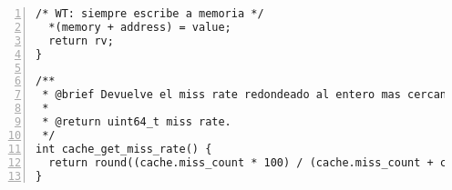 \documentclass[11pt,a4paper]{article}
\begin{document}
\begin{lstlisting}[numbers=left, tabsize=2, basicstyle=\fontsize{11}{13}\ttfamily, frame=single, caption={makefile}]
  /* WT: siempre escribe a memoria */
  *(memory + address) = value;
  return rv;
}

/**
 * @brief Devuelve el miss rate redondeado al entero mas cercano.
 *
 * @return uint64_t miss rate.
 */
int cache_get_miss_rate() {
  return round((cache.miss_count * 100) / (cache.miss_count + cache.hit_count));
}

\end{lstlisting}
\end{document}
